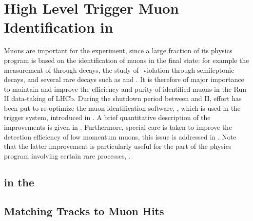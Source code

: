 \chapter{High Level Trigger Muon Identification in \runtwo}
\label{Muon_id_hlt}

Muons are important for the \lhcb experiment, since a large fraction of its physics program is based on
the identification of muons in the final state: for example the measurement of \phis through \BsJpsiPhi decays,
the study of \CP-violation through semileptonic decays, and several rare decays such as \BdKstmumu and \Bsmm.
It is therefore of major importance to maintain and improve the efficiency and purity of identified muons in
the Run II data-taking of LHCb. During the shutdown period between \runone and II, effort has been put to
re-optimize the muon identification software, \muonID, which is used in the \lhcb trigger system, introduced in .
A brief quantitative description of the \muonID improvements is given in .
Furthermore, special care is taken to improve the detection efficiency of low momentum muons, this issue is
addressed in . Note that the latter improvement is particularly useful for the part
of the \lhcb physics program involving certain rare processes, \eg \cite{LHCB-CONF-2016-013-001,LHCb-CONF-2016-012}.

\section{\hltone \muonID in the \lhc \runtwo}
\label{muid_hlt1}


\section{Matching \velo Tracks to Muon Hits}
\label{mvm_algorrithm}

